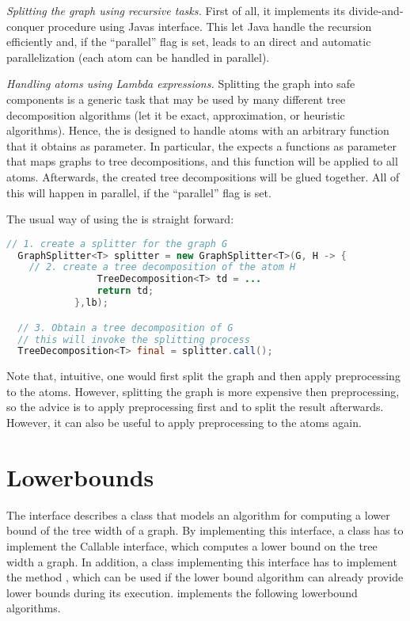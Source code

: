 \documentclass[a4paper, ukenglish, twoside, openright]{jdrasilmanual}
\begin{document}
\emph{Splitting the graph using recursive tasks.} First of all, it implements its
divide-and-conquer procedure using Javas 
interface. This let Java handle the recursion efficiently and, if the
``parallel'' flag is set, leads to an direct and automatic parallelization (each atom can
be handled in parallel).

\emph{Handling atoms using Lambda expressions.} Splitting the graph
into safe components is a generic task that may be used by many
different tree decomposition algorithms (let it be exact, approximation,
or heuristic algorithms). Hence, the  is
designed to handle atoms with an arbitrary function that it obtains as
parameter. In particular, the  expects a
functions as parameter that maps graphs to tree decompositions, and
this function will be applied to all atoms. Afterwards, the created
tree decompositions will be glued together. All of this will happen in
parallel, if the ``parallel'' flag is set.

The usual way of using the  is straight forward:
\begin{lstlisting}[language=Java]
  // 1. create a splitter for the graph G
  GraphSplitter<T> splitter = new GraphSplitter<T>(G, H -> {
    // 2. create a tree decomposition of the atom H
                TreeDecomposition<T> td = ...
                return td;
            },lb);

  // 3. Obtain a tree decomposition of G
  // this will invoke the splitting process
  TreeDecomposition<T> final = splitter.call();
\end{lstlisting}
Note that, intuitive, one would first split the graph and then apply
preprocessing to the atoms. However, splitting the graph is more
expensive then preprocessing, so the advice is to apply preprocessing
first and to split the result afterwards. However, it can also be
useful to apply preprocessing to the atoms again.

\chapter{Lowerbounds}
The  interface describes a class that models an
algorithm for computing a lower bound of the tree width of a graph.
By implementing this interface, a class has to implement the Callable
interface, which computes a lower bound on the tree width 
a graph. In addition, a class implementing this interface has to
implement the method , which can be used
if the lower bound algorithm can already provide lower bounds during
its execution. \Jdrasil{} implements the following lowerbound algorithms.
\end{document}
